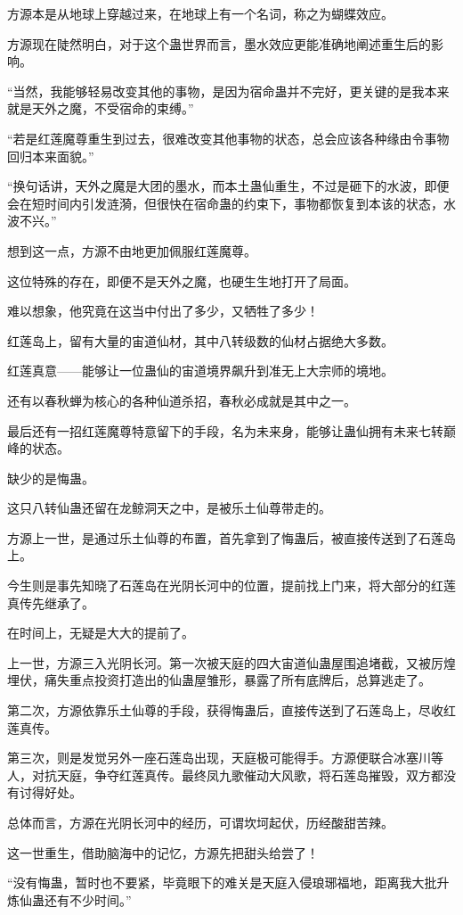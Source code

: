 \begin{this_body}
方源本是从地球上穿越过来，在地球上有一个名词，称之为蝴蝶效应。

方源现在陡然明白，对于这个蛊世界而言，墨水效应更能准确地阐述重生后的影响。

“当然，我能够轻易改变其他的事物，是因为宿命蛊并不完好，更关键的是我本来就是天外之魔，不受宿命的束缚。”

“若是红莲魔尊重生到过去，很难改变其他事物的状态，总会应该各种缘由令事物回归本来面貌。”

“换句话讲，天外之魔是大团的墨水，而本土蛊仙重生，不过是砸下的水波，即便会在短时间内引发涟漪，但很快在宿命蛊的约束下，事物都恢复到本该的状态，水波不兴。”

想到这一点，方源不由地更加佩服红莲魔尊。

这位特殊的存在，即便不是天外之魔，也硬生生地打开了局面。

难以想象，他究竟在这当中付出了多少，又牺牲了多少！

红莲岛上，留有大量的宙道仙材，其中八转级数的仙材占据绝大多数。

红莲真意——能够让一位蛊仙的宙道境界飙升到准无上大宗师的境地。

还有以春秋蝉为核心的各种仙道杀招，春秋必成就是其中之一。

最后还有一招红莲魔尊特意留下的手段，名为未来身，能够让蛊仙拥有未来七转巅峰的状态。

缺少的是悔蛊。

这只八转仙蛊还留在龙鲸洞天之中，是被乐土仙尊带走的。

方源上一世，是通过乐土仙尊的布置，首先拿到了悔蛊后，被直接传送到了石莲岛上。

今生则是事先知晓了石莲岛在光阴长河中的位置，提前找上门来，将大部分的红莲真传先继承了。

在时间上，无疑是大大的提前了。

上一世，方源三入光阴长河。第一次被天庭的四大宙道仙蛊屋围追堵截，又被厉煌埋伏，痛失重点投资打造出的仙蛊屋雏形，暴露了所有底牌后，总算逃走了。

第二次，方源依靠乐土仙尊的手段，获得悔蛊后，直接传送到了石莲岛上，尽收红莲真传。

第三次，则是发觉另外一座石莲岛出现，天庭极可能得手。方源便联合冰塞川等人，对抗天庭，争夺红莲真传。最终凤九歌催动大风歌，将石莲岛摧毁，双方都没有讨得好处。

总体而言，方源在光阴长河中的经历，可谓坎坷起伏，历经酸甜苦辣。

这一世重生，借助脑海中的记忆，方源先把甜头给尝了！

“没有悔蛊，暂时也不要紧，毕竟眼下的难关是天庭入侵琅琊福地，距离我大批升炼仙蛊还有不少时间。”


\end{this_body}
